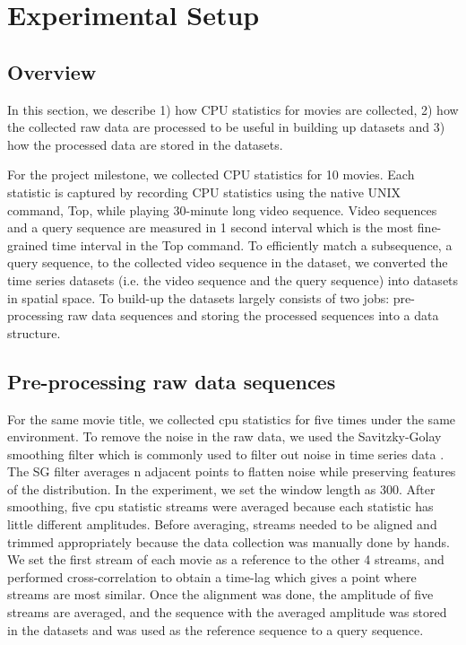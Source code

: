\section{Experimental Setup}
\label{sec:experiments}

\subsection{Overview}
In this section, we describe 1) how CPU statistics for movies are collected, 2) how the collected raw data are processed to be useful in building up datasets and 3) how the processed data are stored in the datasets.

For the project milestone, we collected CPU statistics for 10 movies. Each statistic is captured by recording CPU statistics using the native UNIX command, Top, while playing 30-minute long video sequence. Video sequences and a query sequence are measured in 1 second interval which is the most fine-grained time interval in the Top command. To efficiently match a subsequence, a query sequence, to the collected video sequence in the dataset, we converted the time series datasets (i.e. the video sequence and the query sequence) into datasets in spatial space. To build-up the datasets largely consists of two jobs: pre-processing raw data sequences and storing the processed sequences into a data structure.

\subsection{Pre-processing raw data sequences}
For the same movie title, we collected cpu statistics for five times under the same environment. To remove the noise in the raw data, we used the Savitzky-Golay smoothing filter which is commonly used to filter out noise in time series data \cite{SGfilter}. The SG filter averages n adjacent points to flatten noise while preserving features of the distribution. In the experiment, we set the window length as 300. After smoothing, five cpu statistic streams were averaged because each statistic has little different amplitudes. Before averaging, streams needed to be aligned and trimmed appropriately because the data collection was manually done by hands. We set the first stream of each movie as a reference to the other 4 streams, and performed cross-correlation to obtain a time-lag which gives a point where streams are most similar. Once the alignment was done, the amplitude of five streams are averaged, and the sequence with the averaged amplitude was stored in the datasets and was used as the reference sequence to a query sequence.

